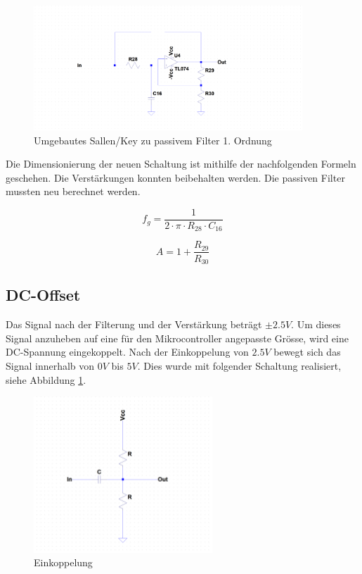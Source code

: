 \begin{figure}[H]
\begin{center}
\includegraphics[width=0.9\textwidth]{images/Analoge_Schaltung_Sallentopassive.png}
\caption{Umgebautes Sallen/Key zu passivem Filter 1. Ordnung}
\end{center}
\end{figure}

Die Dimensionierung der neuen Schaltung ist mithilfe der nachfolgenden Formeln geschehen. Die Verstärkungen konnten beibehalten werden. Die passiven Filter mussten neu berechnet werden.\cite{wiki}

\begin{equation}
f_g=\frac{1}{2 \cdot \pi \cdot R_{28} \cdot C_{16}}
\label{eq:Grenzfrequenz}
\end{equation}

\begin{equation}
A=1+\frac{R_{29}}{R_{30}}
\label{eq:Verstärkung}
\end{equation}

\subsection{DC-Offset}
Das Signal nach der Filterung und der Verstärkung beträgt $\pm 2.5V$. Um dieses Signal anzuheben auf eine für den Mikrocontroller angepasste Grösse, wird eine DC-Spannung eingekoppelt. Nach der Einkoppelung von $2.5V$ bewegt sich das Signal innerhalb von $0V$ bis $5V$. Dies wurde mit folgender Schaltung realisiert, siehe Abbildung \ref{fig:Einkoppelung}.


\begin{figure}[H]
\begin{center}
\includegraphics[width=0.6\textwidth]{images/Analoge_Schaltung_Einkoppelung.png}
\caption{Einkoppelung}
\label{fig:Einkoppelung}
\end{center}
\end{figure}

